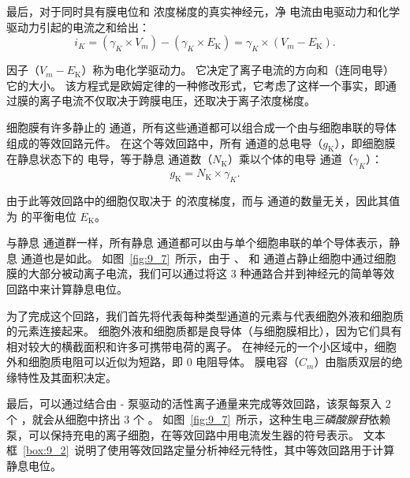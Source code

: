 最后，对于同时具有膜电位和  浓度梯度的真实神经元，净  电流由电驱动力和化学驱动力引起的电流之和给出：
\begin{equation}
	i_K = (\gamma_K \times V_m) - 
		(\gamma_K \times E_\text{K}) =
		\gamma_K \times (V_m - E_\text{K}).
\end{equation}


因子（$V_m - E_\text{K}$）称为电化学驱动力。
它决定了离子电流的方向和（连同电导）它的大小。
该方程式是欧姆定律的一种修改形式，它考虑了这样一个事实，即通过膜的离子电流不仅取决于跨膜电压，还取决于离子浓度梯度。


细胞膜有许多静止的  通道，所有这些通道都可以组合成一个由与细胞串联的导体组成的等效回路元件。
在这个等效回路中，所有  通道的总电导（$g_\text{K}$），即细胞膜在静息状态下的  电导，等于静息  通道数（$N_\text{K}$）乘以个体的电导 通道（$\gamma_K$）：
\begin{equation}
	g_\text{K} = N_\text{K} \times \gamma_K.
\end{equation}


由于此等效回路中的细胞仅取决于  的浓度梯度，而与  通道的数量无关，因此其值为  的平衡电位 $E_\text{K}$。


与静息  通道群一样，所有静息  通道都可以由与单个细胞串联的单个导体表示，静息  通道也是如此。
如图~\ref{fig:9_7}~所示，由于 、 和  通道占静止细胞中通过细胞膜的大部分被动离子电流，我们可以通过将这 3 种通路合并到神经元的简单等效回路中来计算静息电位。


为了完成这个回路，我们首先将代表每种类型通道的元素与代表细胞外液和细胞质的元素连接起来。
细胞外液和细胞质都是良导体（与细胞膜相比），因为它们具有相对较大的横截面积和许多可携带电荷的离子。
在神经元的一个小区域中，细胞外和细胞质电阻可以近似为短路，即 0 电阻导体。
膜电容（$C_m$）由脂质双层的绝缘特性及其面积决定。


最后，可以通过结合由 - 泵驱动的活性离子通量来完成等效回路，该泵每泵入 2 个 ，就会从细胞中挤出 3 个 。
如图~\ref{fig:9_7}~所示，这种生电\textit{三磷酸腺苷}依赖泵，可以保持充电的离子细胞，在等效回路中用电流发生器的符号表示。
文本框~\ref{box:9_2}~说明了使用等效回路定量分析神经元特性，其中等效回路用于计算静息电位。


